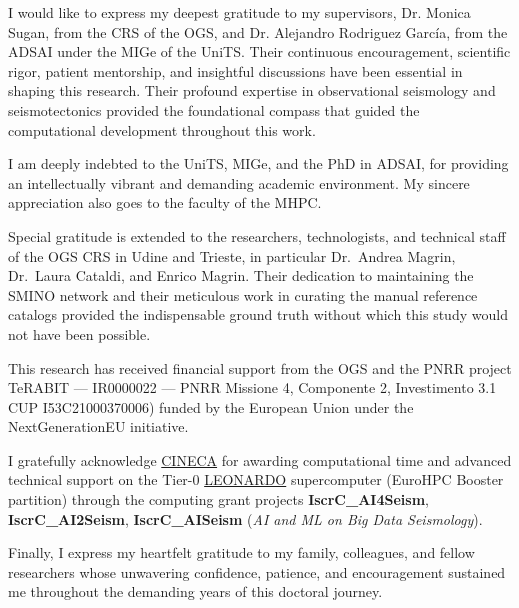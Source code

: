 
\label{chap:Acknowledgement}

I would like to express my deepest gratitude to my supervisors, Dr. Monica
Sugan, from the \acf{CRS} of the \acf{OGS}, and Dr. Alejandro Rodriguez García,
from the \acf{ADSAI} under the \acf{MIGe} of the \acf{UniTS}. Their continuous
encouragement, scientific rigor, patient mentorship, and insightful discussions
have been essential in shaping this research. Their profound expertise in
observational seismology and seismotectonics provided the foundational compass
that guided the computational development throughout this work.

I am deeply indebted to the \acf{UniTS}, \acf{MIGe}, and the PhD in
\acf{ADSAI}, for providing an intellectually vibrant and demanding academic
environment. My sincere appreciation also goes to the faculty of the
\acf{MHPC}.

Special gratitude is extended to the researchers, technologists, and technical
staff of the \ac{OGS} \ac{CRS} in Udine and Trieste, in particular
Dr.~Andrea Magrin, Dr.~Laura Cataldi, and Enrico Magrin. Their dedication to
maintaining the \ac{SMINO} network and their meticulous work in curating the
manual reference catalogs provided the indispensable ground truth without
which this study would not have been possible.

This research has received financial support from the \ac{OGS} and the
\acf{PNRR} project \acf{TeRABIT} --- IR0000022 --- PNRR Missione 4, Componente
2, Investimento 3.1 CUP I53C21000370006) funded by the European Union under the
NextGenerationEU initiative.

I gratefully acknowledge \href{https://www.cineca.it/en}{\acf{CINECA}} for
awarding computational time and advanced technical support on the Tier-0
\href{https://wiki.u-gov.it/confluence/display/SCAIUS/UG3.2.1\%3A+LEONARDO+Booster+UserGuide}{LEONARDO}
supercomputer (EuroHPC Booster partition) through the computing grant projects
\textbf{IscrC\_AI4Seism}, \textbf{IscrC\_AI2Seism}, \textbf{IscrC\_AISeism}
(\textit{\acf{AI} and \acf{ML} on Big Data Seismology}).

Finally, I express my heartfelt gratitude to my family, colleagues, and fellow
researchers whose unwavering confidence, patience, and encouragement sustained
me throughout the demanding years of this doctoral journey.
